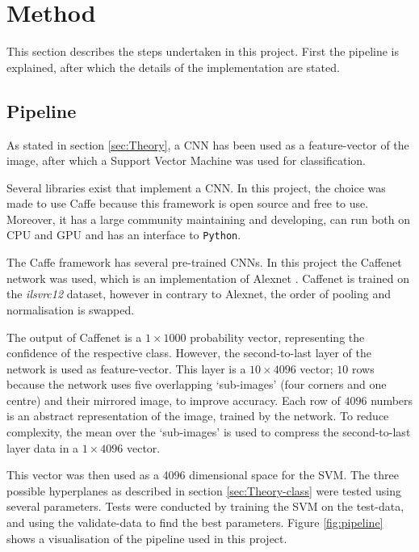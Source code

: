 \section{Method}
\label{sec:Method}
This section describes the steps undertaken in this project.
First the pipeline is explained, after which the details of the implementation are stated.

\subsection{Pipeline}
\label{sec:Method-pipeline}
As stated in section \ref{sec:Theory}, a CNN has been used as a feature-vector of the image, after which a Support Vector Machine was used for classification.

Several libraries exist that implement a CNN.
In this project, the choice was made to use Caffe \citep{jia2014caffe} because this framework is open source and free to use.
Moreover, it has a large community maintaining and developing, can run both on CPU and GPU and has an interface to \texttt{Python}.

The Caffe framework has several pre-trained CNNs.
In this project the Caffenet network was used, which is an implementation of Alexnet \citep{krizhevsky2012imagenet}. Caffenet is trained on the \textit{ilsvrc12} dataset, however in contrary to Alexnet, the order of pooling and normalisation is swapped.

The output of Caffenet is a $1\times1000$ probability vector, representing the confidence of the respective class.
However, the second-to-last layer of the network is used as feature-vector. This layer is a $10\times4096$ vector; $10$ rows because the network uses five overlapping `sub-images' (four corners and one centre) and their mirrored image, to improve accuracy.
Each row of $4096$ numbers is an abstract representation of the image, trained by the network.
To reduce complexity, the mean over the `sub-images' is used to compress the second-to-last layer data in a $1\times4096$ vector.

This vector was then used as a 4096 dimensional space for the SVM.
The three possible hyperplanes as described in section \ref{sec:Theory-class} were tested using several parameters.
Tests were conducted by training the SVM on the test-data, and using the validate-data to find the best parameters.
Figure \ref{fig:pipeline} shows a visualisation of the pipeline used in this project.

